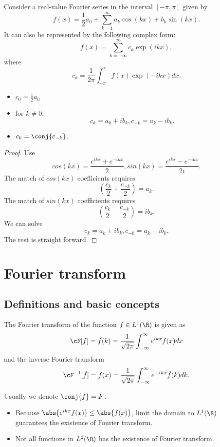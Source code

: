 \begin{refsection}
\begin{lemma}\cite[271]{prosperetti2013advanced}
	Consider a real-value Fourier series in the interval $[-\pi,\pi]$ given by
	$$f(x) = \frac{1}{2}a_0 + \sum_{k=1}^\infty a_k \cos(kx) + b_k \sin(kx).$$
	It can also be represented by the following complex form:
	$$f(x) = \sum_{k= -\infty}^\infty c_k \exp(ikx)  ,$$
	where 
	$$c_k = \frac{1}{2\pi} \int_{-\pi}^{\pi} f(x)\exp(-ikx)dx .$$
	\begin{itemize}
		\item $c_0 = \frac{1}{2}a_0$
		\item for $k\neq 0$,$$c_k = a_k + ib_k, c_{-k} = a_k - i b_k.$$
		\item $c_k = \conj{c_{-k}}$.
	\end{itemize}
	
\end{lemma}
\begin{proof}
	Use $$cos(kx) = \frac{e^{ikx} + e^{-ikx}}{2},sin(kx) = \frac{e^{ikx} - e^{-ikx}}{2i}.$$
	The match of $cos(kx)$ coefficients requires
	$$(\frac{c_k}{2} + \frac{c_{-k}}{2}) = a_k.$$
	The match of $sin(kx)$ coefficients requires
	$$(\frac{c_k}{2} - \frac{c_{-k}}{2}) = ib_k.$$
	We can solve
	$$c_k = a_k + ib_k, c_{-k} = a_k - i b_k.$$
	The rest is straight forward.
\end{proof}

\section{Fourier transform}
\subsection{Definitions and basic concepts}
\begin{definition}
	\cite[267]{prosperetti2013advanced} The Fourier transform of the function $f \in L^1(\R)$ is given as
	$$\cF[f] = \tilde{f}(k) = \frac{1}{\sqrt{2\pi}} \int_{-\infty}^\infty e^{ikx}f(x)dx$$
	and the inverse Fourier transform
	$$\cF^{-1}[\tilde{f}] = f(x) = \frac{1}{\sqrt{2\pi}} \int_{-\infty}^\infty e^{-ikx}\tilde{f}(k)dk.$$
	
	Usually we denote $\conj{f} = F$.
\end{definition}


\begin{remark}\hfill
	\begin{itemize}
		\item Because $\abs{e^{ikx}f(x)} \leq \abs{f(x)}$, limit the domain to $L^1(\R)$ guarantees the existence of Fourier transform.
		\item \cite[194]{debnath2005hilbert} Not all functions in $L^2(\R)$ has the existence of Fourier transform.
	\end{itemize}
\end{remark}




\end{refsection}
